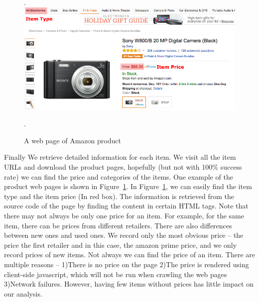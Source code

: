 \documentclass{llncs}
\begin{document}
\begin{figure}[H].
\centering
\includegraphics[width=.85\textwidth]{item.png}
\caption{A web page of Amazon product}.
\label{itempage}
\end{figure}

Finally We retrieve detailed information for each item. We visit all the item URLs and download the product pages, hopefully (but not with 100\% success rate) we can find the price and categories of the items. One example of the product web pages is shown in Figure~\ref{itempage}. In Figure~\ref{itempage}, we can easily find the item type and the item price (In red box). The information is retrieved from the source code of the page by finding the content in certain HTML tags. Note that there may not always be only one price for an item. For example, for the same item, there can be prices from different retailers. There are also differences between new ones and used ones. We record only the most obvious price -- the price the first retailer and in this case, the amazon prime price, and we only record prices of new items. Not always we can find the price of an item. There are multiple reasons -- 1)There is no price on the page 2)The price is rendered using client-side javascript, which will not be run when crawling the web pages 3)Network failures. However, having few items without prices has little impact on our analysis.
\end{document}
